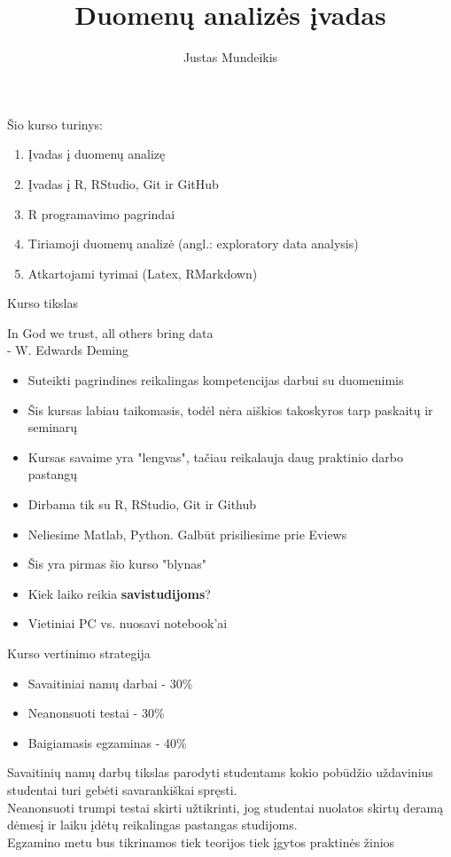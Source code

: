\documentclass[11pt,xcolor=table]{beamer}
\author{Justas Mundeikis}
\title{Duomenų analizės įvadas}
\begin{document}
\begin{frame}
\titlepage
\end{frame}
\begin{frame}{Šio kurso turinys:}
\begin{enumerate}
\item Įvadas į duomenų analizę 
\item Įvadas į R, RStudio, Git ir GitHub
\item R programavimo pagrindai
\item Tiriamoji duomenų analizė (angl.: exploratory data analysis)
\item Atkartojami tyrimai (Latex, RMarkdown)
\end{enumerate}
\end{frame}
\begin{frame}{Kurso tikslas}

{\Large In God we trust, all others bring data}\\ 
- W. Edwards Deming 

\begin{itemize}
\item Suteikti pagrindines reikalingas kompetencijas darbui su duomenimis
\item Šis kursas labiau taikomasis, todėl nėra aiškios takoskyros tarp paskaitų ir seminarų
\item Kursas savaime yra "lengvas", tačiau reikalauja daug praktinio darbo pastangų
\item Dirbama tik su R, RStudio, Git ir Github
\item Neliesime Matlab, Python. Galbūt prisiliesime prie Eviews
\item Šis yra pirmas šio kurso "blynas"
\item Kiek laiko reikia \textbf{savistudijoms}?
\item Vietiniai PC vs. nuosavi notebook'ai
\end{itemize}
\end{frame}
\begin{frame}{Kurso vertinimo strategija}

\begin{itemize}
\item Savaitiniai namų darbai - 30\%
\item Neanonsuoti testai - 30\%
\item Baigiamasis egzaminas - 40\%
\end{itemize}
Savaitinių namų darbų tikslas parodyti studentams kokio pobūdžio uždavinius studentai turi gebėti savarankiškai spręsti.\\
Neanonsuoti trumpi testai skirti užtikrinti, jog studentai nuolatos skirtų deramą dėmesį ir laiku įdėtų reikalingas pastangas studijoms.\\
Egzamino metu bus tikrinamos tiek teorijos tiek įgytos praktinės žinios 
\end{frame}
\end{document}
